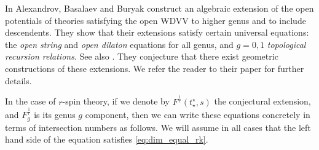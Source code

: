 \documentclass[11pt]{amsart}
\theoremstyle{definition}
\theoremstyle{remark}
\newcommand{\<}{\left<}
\renewcommand{\>}{\right>}
\numberwithin{equation}{section}
\begin{document}
In \cite{alexandrov2023construction} Alexandrov, Basalaev and Buryak construct an algebraic extension of the open potentials of theories satisfying the open WDVV to higher genus and to include descendents. They show that their extensions satisfy certain universal equations: the \emph{open string} and \emph{open dilaton} equations for all genus, and $g=0,1$ \emph{topological recursion relations}. See also \cite{gomez2021open}.
They conjecture that there exist geometric constructions of these extensions. We refer the reader to their paper for further details.

In the case of $r$-spin theory, if we denote by $F^{\frac{1}{r}}(t_\star^\star,s)$ the conjectural extension, and $F^{\frac{1}{r}}_g$ is its genus $g$ component, then we can write these equations concretely in terms of intersection numbers as follows. We will assume in all cases that the left hand side of the equation satisfies \eqref{eq:dim_equal_rk}.
\end{document}
